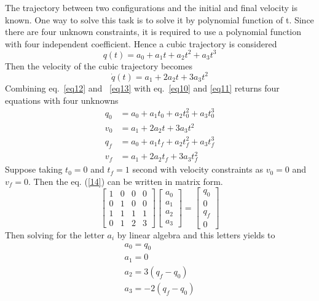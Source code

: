 The trajectory between two configurations and the initial and final velocity is known. One way to solve this task is to solve it by polynomial function of t. Since there are four unknown constraints, it is required to use a polynomial function with four independent coefficient. Hence a cubic trajectory is considered
\begin{equation} \label{eq12}
    q(t) = a_0 + a_1t + a_2t^2 + a_3t^3
\end{equation}
Then the velocity of the cubic trajectory becomes
\begin{equation} \label{eq13}
    \dot{q}(t) = a_1 + 2a_2t+ 3 a_3t^2
\end{equation}
Combining eq.~\eqref{eq12} and ~\eqref{eq13} with eq.~\eqref{eq10} and \ref{eq11} returns four equations with four unknowns
\begin{equation} \label{14}
    \begin{split}
        q_0 &= a_0 + a_1t_0 + a_2t_0^2 + a_3t_0^3 \\
        v_0 & = a_1 + 2a_2t+ 3 a_3t^2 \\
        q_f &= a_0 + a_1t_f + a_2t_f^2 + a_3t_f^3 \\
        v_f & = a_1 + 2a_2t_f+ 3 a_3t_f^2
    \end{split}
\end{equation}
Suppose taking $t_0 = 0$ and $t_f = 1$ second with velocity constraints as $v_0 = 0$ and $v_f = 0$. Then the eq. (\ref{14}) can be written in matrix form.
\begin{equation*}
    \begin{bmatrix}
1 & 0 & 0 & 0 \\
0 & 1 & 0 & 0 \\
 1 & 1& 1& 1 \\
0&1 &2 &3
\end{bmatrix} \begin{bmatrix}
a_0 \\
a_1 \\
a_2 \\
a_3
\end{bmatrix} = \begin{bmatrix}
q_0 \\
0\\
q_f \\
0
\end{bmatrix}
\end{equation*}
Then solving for the letter $a_i$ by linear algebra and this letters yields to
\begin{equation} \label{15}
    \begin{split}
        a_0 = q_0 \\
        a_1 = 0 \\
        a_2 = 3(q_f - q_0 ) \\
        a_3 = -2(q_f - q_0)
    \end{split}
\end{equation}
